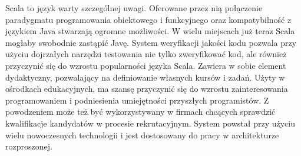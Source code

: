\documentclass[wimgr]{xmgr}
\begin{document}
\summary
Scala to język warty szczególnej uwagi. Oferowane przez nią połączenie paradygmatu programowania obiektowego i funkcyjnego oraz kompatybilność z językiem Java stwarzają ogromne możliwości. W wielu miejscach już teraz Scala mogłaby swobodnie zastąpić Javę. System weryfikacji jakości kodu pozwala przy użyciu dojrzałych narzędzi testowania nie tylko zweryfikować kod, ale również przyczynić się do wzrostu popularności języka Scala. Zawiera w sobie element dydaktyczny, pozwalający na definiowanie własnych kursów i zadań. Użyty w ośrodkach edukacyjnych, ma szansę przyczynić się do wzrostu zainteresowania programowaniem i podniesienia umiejętności przyszłych programistów. Z powodzeniem może też być wykorzystywany w firmach chcących sprawdzić kwalifikacje kandydatów w procesie rekrutacyjnym.
System powstał przy użyciu wielu nowoczesnych technologii i jest dostosowany do pracy w architekturze rozproszonej.




\listoftables

\listoffigures

\oswiadczenie
\end{document}
